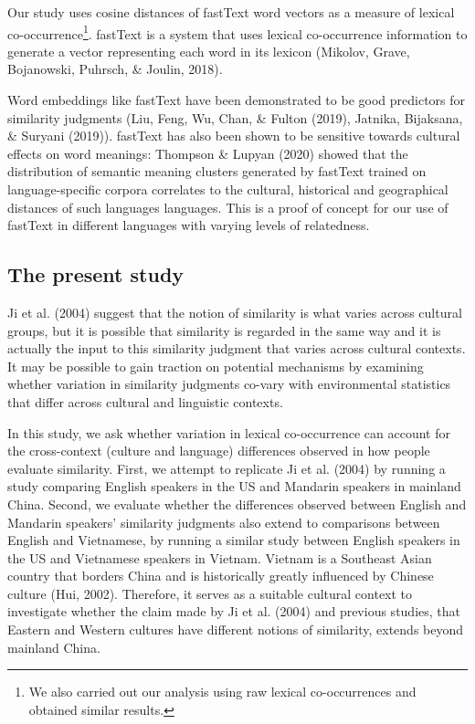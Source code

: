 \documentclass[10pt, letterpaper]{article}
\begin{document}
Our study uses cosine distances of fastText word vectors as a measure of
lexical co-occurrence\footnote{We also carried out our analysis using
  raw lexical co-occurrences and obtained similar results.}. fastText is
a system that uses lexical co-occurrence information to generate a
vector representing each word in its lexicon (Mikolov, Grave,
Bojanowski, Puhrsch, \& Joulin, 2018).

Word embeddings like fastText have been demonstrated to be good
predictors for similarity judgments (Liu, Feng, Wu, Chan, \& Fulton
(2019), Jatnika, Bijaksana, \& Suryani (2019)). fastText has also been
shown to be sensitive towards cultural effects on word meanings:
Thompson \& Lupyan (2020) showed that the distribution of semantic
meaning clusters generated by fastText trained on language-specific
corpora correlates to the cultural, historical and geographical
distances of such languages languages. This is a proof of concept for
our use of fastText in different languages with varying levels of
relatedness.

\hypertarget{the-present-study}{%
\subsection{The present study}\label{the-present-study}}

Ji et al. (2004) suggest that the notion of similarity is what varies
across cultural groups, but it is possible that similarity is regarded
in the same way and it is actually the input to this similarity judgment
that varies across cultural contexts. It may be possible to gain
traction on potential mechanisms by examining whether variation in
similarity judgments co-vary with environmental statistics that differ
across cultural and linguistic contexts.

In this study, we ask whether variation in lexical co-occurrence can
account for the cross-context (culture and language) differences
observed in how people evaluate similarity. First, we attempt to
replicate Ji et al. (2004) by running a study comparing English speakers
in the US and Mandarin speakers in mainland China. Second, we evaluate
whether the differences observed between English and Mandarin speakers'
similarity judgments also extend to comparisons between English and
Vietnamese, by running a similar study between English speakers in the
US and Vietnamese speakers in Vietnam. Vietnam is a Southeast Asian
country that borders China and is historically greatly influenced by
Chinese culture (Hui, 2002). Therefore, it serves as a suitable cultural
context to investigate whether the claim made by Ji et al. (2004) and
previous studies, that Eastern and Western cultures have different
notions of similarity, extends beyond mainland China.
\end{document}
